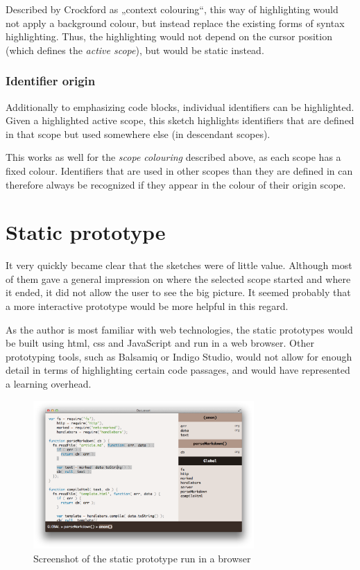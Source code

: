 Described by Crockford \citeyear{crockford} as „context colouring“, this
way of highlighting would not apply a background colour, but instead
replace the existing forms of syntax highlighting. Thus, the
highlighting would not depend on the cursor position (which defines the
\emph{active scope}), but would be static instead.

\subsubsection{Identifier origin}\label{identifier-origin}

Additionally to emphasizing code blocks, individual identifiers can be
highlighted. Given a highlighted active scope, this sketch highlights
identifiers that are defined in that scope but used somewhere else (in
descendant scopes).

This works as well for the \emph{scope colouring} described above, as
each scope has a fixed colour. Identifiers that are used in other scopes
than they are defined in can therefore always be recognized if they
appear in the colour of their origin scope.

\section{Static prototype}\label{static-prototype}

It very quickly became clear that the sketches were of little value.
Although most of them gave a general impression on where the selected
scope started and where it ended, it did not allow the user to see the
big picture. It seemed probably that a more interactive prototype would
be more helpful in this regard.

As the author is most familiar with web technologies, the static
prototypes would be built using \ac{html}, \ac{css} and JavaScript and
run in a web browser. Other prototyping tools, such as Balsamiq or
Indigo Studio, would not allow for enough detail in terms of
highlighting certain code passages, and would have represented a
learning overhead.

\begin{figure}[htbp]
\centering
\includegraphics[keepaspectratio,width=0.75\textwidth,height=0.75\textheight]{img/prototype-1.png}
\caption{Screenshot of the static prototype run in a browser}
\label{fig:syntaxhighlighting}
\end{figure}

